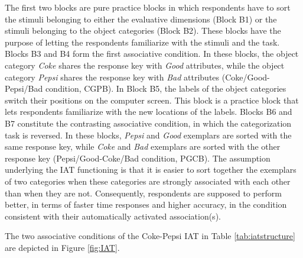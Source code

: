 \documentclass[12pt]{book}
\begin{document}
 The first two blocks are pure practice blocks in which respondents have to sort the stimuli belonging to either the evaluative dimensions (Block B1) or the stimuli belonging to the object categories (Block B2). These blocks have the purpose of letting the respondents familiarize with the stimuli and the task. Blocks B3 and B4 form the first associative condition. In these blocks, the object category \emph{Coke} shares the response key with \emph{Good} attributes, while the object category \emph{Pepsi} shares the response key with \emph{Bad} attributes (Coke/Good-Pepsi/Bad condition, CGPB). 
In Block B5, the labels of the object categories switch their positions on the computer screen. This block is a practice block  that lets respondents familiarize with the new locations of the labels. 
Blocks B6 and B7 constitute the contrasting associative condition, in which the categorization task is reversed. In these blocks, \emph{Pepsi} and \emph{Good} exemplars are sorted with the same response key, while \emph{Coke} and \emph{Bad} exemplars are sorted with the other response key (Pepsi/Good-Coke/Bad condition, PGCB). 
The assumption underlying the IAT functioning is that it is easier to sort together the exemplars of two categories when these categories are strongly associated with each other than when they are not. Consequently, respondents are supposed to perform better, in terms of faster time responses and higher accuracy, in the condition consistent with their automatically activated association(s).

The two associative conditions of the Coke-Pepsi IAT in Table \ref{tab:iatstructure} are depicted in Figure \ref{fig:IAT}. 
\end{document}
